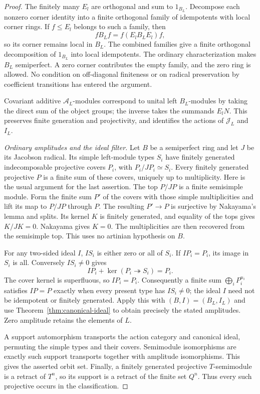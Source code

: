 \begin{proof}
The finitely many $E_l$ are orthogonal and sum to $1_{B_L}$.
Decompose each nonzero corner identity into a finite orthogonal family
of idempotents with local corner rings. If $f\leq E_l$ belongs to
such a family, then
\[
 fB_Lf=f(E_lB_LE_l)f,
\]
so its corner remains local in $B_L$. The combined families give a
finite orthogonal decomposition of $1_{B_L}$ into local idempotents.
The ordinary characterization makes $B_L$ semiperfect. A zero corner
contributes the empty family, and the zero ring is allowed.
No condition on off-diagonal finiteness or on radical preservation by
coefficient transitions has entered the argument.

Covariant additive $\mathcal A_L$-modules correspond to unital left
$B_L$-modules by taking the direct sum of the object groups; the inverse
takes the summands $E_lN$. This preserves finite generation and
projectivity, and identifies the actions of $\mathcal J_L$ and $I_L$.

\emph{Ordinary amplitudes and the ideal filter.}
Let $B$ be a semiperfect ring and let $J$ be its Jacobson radical.
Its simple left-module types $S_i$ have finitely generated
indecomposable projective covers $P_i$, with
$P_i/JP_i\simeq S_i$. Every finitely generated projective $P$ is a
finite sum of these covers, uniquely up to multiplicity. Here is the
usual argument for the last assertion. The top $P/JP$ is a finite
semisimple module. Form the finite sum $P'$ of the covers with those
simple multiplicities and lift its map to $P/JP$ through $P$.
The resulting $P'\to P$ is surjective by Nakayama's lemma and splits.
Its kernel $K$ is finitely generated, and equality of the tops gives
$K/JK=0$. Nakayama gives $K=0$. The multiplicities are then recovered
from the semisimple top. This uses no artinian hypothesis on $B$.

For any two-sided ideal $I$, $IS_i$ is either zero or all of $S_i$.
If $IP_i=P_i$, its image in $S_i$ is all. Conversely $IS_i\ne0$
gives
\[
 IP_i+\ker(P_i\twoheadrightarrow S_i)=P_i.
\]
The cover kernel is superfluous, so $IP_i=P_i$. Consequently a finite
sum $\bigoplus_iP_i^{n_i}$ satisfies $IP=P$ exactly when every present
type has $IS_i\ne0$; the ideal $I$ need not be idempotent or finitely
generated. Apply this with $(B,I)=(B_L,I_L)$ and use
Theorem~\ref{thm:canonical-ideal} to obtain precisely the stated
amplitudes. Zero amplitude retains the elements of $L$.

A support automorphism transports the action category and canonical
ideal, permuting the simple types and their covers. Semimodule
isomorphisms are exactly such support transports together with
amplitude isomorphisms. This gives the asserted orbit set. Finally,
a finitely generated projective $T$-semimodule is a retract of $T^n$,
so its support is a retract of the finite set $Q^n$. Thus every such
projective occurs in the classification.


\end{proof}
